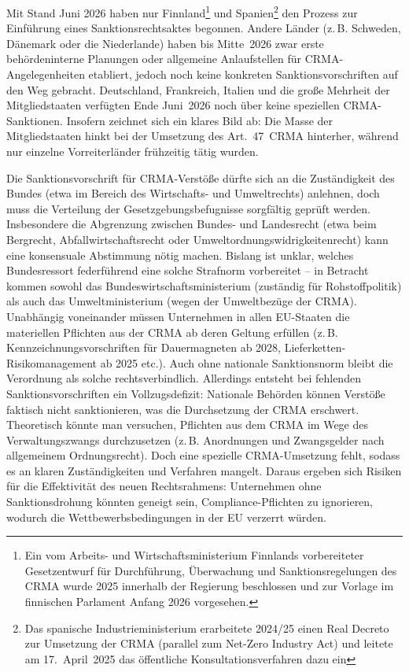 \documentclass[12pt,a4paper,oneside]{book} %
\begin{document}
Mit Stand Juni 2026 haben nur Finnland\footnote{Ein vom Arbeits- und Wirtschaftsministerium Finnlands vorbereiteter Gesetzentwurf für Durchführung, Überwachung und Sanktionsregelungen des CRMA wurde 2025 innerhalb der Regierung beschlossen und zur Vorlage im finnischen Parlament Anfang 2026 vorgesehen.} und Spanien\footnote{Das spanische Industrieministerium erarbeitete 2024/25 einen Real Decreto zur Umsetzung der CRMA (parallel zum Net-Zero Industry Act) und leitete am 17. April 2025 das öffentliche Konsultationsverfahren dazu ein} den Prozess zur Einführung eines Sanktionsrechtsaktes begonnen. Andere Länder (z. B. Schweden, Dänemark oder die Niederlande) haben bis Mitte 2026 zwar erste behördeninterne Planungen oder allgemeine Anlaufstellen für CRMA-Angelegenheiten etabliert, jedoch noch keine konkreten Sanktionsvorschriften auf den Weg gebracht. Deutschland, Frankreich, Italien und die große Mehrheit der Mitgliedstaaten verfügten Ende Juni 2026 noch über keine speziellen CRMA-Sanktionen. Insofern zeichnet sich ein klares Bild ab: Die Masse der Mitgliedstaaten hinkt bei der Umsetzung des Art. 47 CRMA hinterher, während nur einzelne Vorreiterländer frühzeitig tätig wurden.

Die Sanktionsvorschrift für CRMA-Verstöße dürfte sich an die Zuständigkeit des Bundes (etwa im Bereich des Wirtschafts- und Umweltrechts) anlehnen, doch muss die Verteilung der Gesetzgebungsbefugnisse sorgfältig geprüft werden. Insbesondere die Abgrenzung zwischen Bundes- und Landesrecht (etwa beim Bergrecht, Abfallwirtschaftsrecht oder Umweltordnungswidrigkeitenrecht) kann eine konsensuale Abstimmung nötig machen. Bislang ist unklar, welches Bundesressort federführend eine solche Strafnorm vorbereitet – in Betracht kommen sowohl das Bundeswirtschaftsministerium (zuständig für Rohstoffpolitik) als auch das Umweltministerium (wegen der Umweltbezüge der CRMA).  Unabhängig voneinander müssen Unternehmen in allen EU-Staaten die materiellen Pflichten aus der CRMA ab deren Geltung erfüllen (z. B. Kennzeichnungsvorschriften für Dauermagneten ab 2028, Lieferketten-Risikomanagement ab 2025 etc.). Auch ohne nationale Sanktionsnorm bleibt die Verordnung als solche rechtsverbindlich. Allerdings entsteht bei fehlenden Sanktionsvorschriften ein Vollzugsdefizit: Nationale Behörden können Verstöße faktisch nicht sanktionieren, was die Durchsetzung der CRMA erschwert. Theoretisch könnte man versuchen, Pflichten aus dem CRMA im Wege des Verwaltungszwangs durchzusetzen (z. B. Anordnungen und Zwangsgelder nach allgemeinem Ordnungsrecht). Doch eine spezielle CRMA-Umsetzung fehlt, sodass es an klaren Zuständigkeiten und Verfahren mangelt. Daraus ergeben sich Risiken für die Effektivität des neuen Rechtsrahmens: Unternehmen ohne Sanktionsdrohung könnten geneigt sein, Compliance-Pflichten zu ignorieren, wodurch die Wettbewerbsbedingungen in der EU verzerrt würden.
\end{document}
